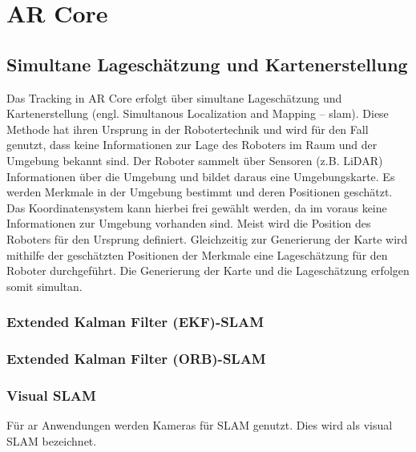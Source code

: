 \section{AR Core}
\subsection{Simultane Lageschätzung und Kartenerstellung}
Das Tracking in AR Core erfolgt über simultane Lageschätzung und Kartenerstellung (engl. Simultanous Localization and Mapping – \acrshort{slam}). Diese Methode hat ihren Ursprung in der Robotertechnik und wird für den Fall genutzt, dass keine Informationen zur Lage des Roboters im Raum und der Umgebung bekannt sind. Der Roboter sammelt über Sensoren (z.B. LiDAR) Informationen über die Umgebung und bildet daraus eine Umgebungskarte. Es werden Merkmale in der Umgebung bestimmt und deren Positionen geschätzt. Das Koordinatensystem kann hierbei frei gewählt werden, da im voraus keine Informationen zur Umgebung vorhanden sind. Meist wird die Position des Roboters für den Ursprung definiert. Gleichzeitig zur Generierung der Karte wird mithilfe der geschätzten Positionen der Merkmale eine Lageschätzung für den Roboter durchgeführt. Die Generierung der Karte und die Lageschätzung erfolgen somit simultan.\cite{slam1} \cite*[][Vgl. S.143f.]{doerner}

\subsubsection{Extended Kalman Filter (EKF)-SLAM}
\subsubsection{Extended Kalman Filter (ORB)-SLAM}

\subsubsection{Visual SLAM}
Für \acrshort{ar} Anwendungen werden Kameras für SLAM genutzt. Dies wird als visual SLAM bezeichnet.